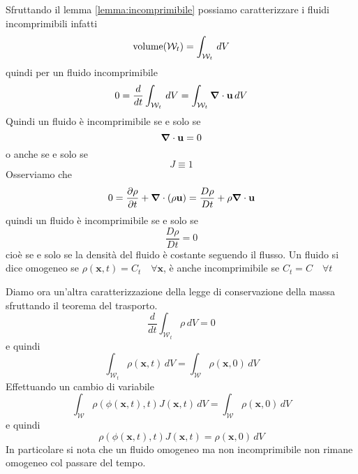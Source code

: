 Sfruttando il lemma \ref{lemma:incomprimibile} possiamo caratterizzare i fluidi incomprimibili infatti
\begin{equation*}
\operatorname{volume}(\mathcal{W}_t) = \int_{\mathcal{W}_t} \, dV
\end{equation*}
quindi per un fluido incomprimibile
\begin{equation*}
0 = \frac{d}{dt} \int_{\mathcal{W}_t} \, dV  = \int_{\mathcal{W}_t} \boldsymbol{\nabla} \cdot \mathbf{u} \, dV
\end{equation*}
Quindi un fluido è incomprimibile se e solo se 
\begin{equation*}
\boldsymbol{\nabla} \cdot \mathbf{u}=0
\end{equation*}
o anche se e solo se
\begin{equation*}
J \equiv 1
\end{equation*}
Osserviamo che
\begin{equation*}
0 = \frac{\partial \rho}{\partial t} + \boldsymbol{\nabla}\cdot(\rho \mathbf{u}) = \frac{D\rho}{Dt} + \rho\boldsymbol{\nabla}\cdot \mathbf{u}
\end{equation*}
quindi un fluido è incomprimibile se e solo se
\begin{equation*}
\frac{D \rho}{Dt} = 0
\end{equation*}
cioè se e solo se la densità del fluido è costante seguendo il flusso.
Un fluido si dice omogeneo se $\rho(\mathbf{x},t)=C_t \quad \forall \mathbf{x}$, è anche incomprimibile se $C_t=C \quad \forall t$

Diamo ora un'altra caratterizzazione della legge di conservazione della massa sfruttando il teorema del trasporto.
$$\frac{d}{dt}\int_{\mathcal{W}_t}\rho\,dV=0$$
e quindi
$$\int_{\mathcal{W}_t}\rho(\mathbf{x},t)\,dV=\int_\mathcal{W}\rho(\mathbf{x},0)\,dV$$
Effettuando un cambio di variabile
$$\int_{\mathcal{W}}\rho(\phi(\mathbf{x},t),t)J(\mathbf{x},t)\,dV=\int_\mathcal{W}\rho(\mathbf{x},0)\,dV$$
e quindi
\begin{equation}
  \boxed{
  \rho(\phi(\mathbf{x},t),t)J(\mathbf{x},t)=\rho(\mathbf{x},0)\,dV
  }
\end{equation}
In particolare si nota che un fluido omogeneo ma non incomprimibile non rimane omogeneo col passare del tempo.

